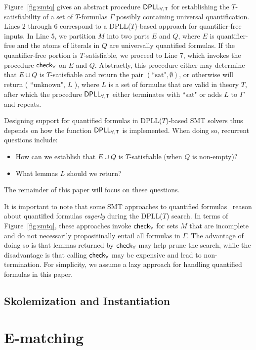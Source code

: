 \documentclass[oribibl]{llncs}
\begin{document}
Figure~\ref{fig:smtq} gives an abstract procedure $\small\mathsf{DPLL_{\forall, T}}$
for establishing the $T$-satisfiability of a set of $T$-formulas $\Gamma$ possibly containing universal quantification.
Lines 2 through 6 correspond to a DPLL($T$)-based approach for quantifier-free inputs.
In Line 5, we partition $M$ into two parts $E$ and $Q$,
where $E$ is quantifier-free and the atoms of literals in $Q$ are universally quantified formulas.
If the quantifier-free portion is $T$-satisfiable,
we proceed to Line 7, which invokes the procedure $\small\mathsf{check}_\forall$ on $E$ and $Q$.
Abstractly, this procedure either may determine that $E \cup Q$ is $T$-satisfiable and return the pair $( \text{``sat"}, \emptyset )$,
or otherwise will return ( ``unknown", $L$ ), where $L$ is a set of formulas that are valid in theory $T$,
after which the procedure $\small\mathsf{DPLL_{\forall, T}}$ either terminates with ``sat" or adds $L$ to $\Gamma$ and repeats.

Designing support for quantified formulas in DPLL($T$)-based SMT solvers 
thus depends on how the function $\small\mathsf{DPLL_{\forall, T}}$ is implemented.
When doing so, recurrent questions include:
\begin{itemize}
\item How can we establish that $E \cup Q$ is $T$-satisfiable (when $Q$ is non-empty)?
\item What lemmas $L$ should we return?
\end{itemize}
The remainder of this paper will focus on these questions.

It is important to note that some SMT approaches to quantified formulas~\cite{}
reason about quantified formulas \emph{eagerly} during the DPLL($T$) search.
In terms of Figure~\ref{fig:smtq}, these approaches invoke $\small\mathsf{check}_\forall$
for sets $M$ that are incomplete and do not necessarily propositinally entail all formulas in $\Gamma$.
The advantage of doing so is that lemmas returned by $\small\mathsf{check}_\forall$ may help prune the search,
while the disadvantage is that calling $\small\mathsf{check}_\forall$ may be expensive and lead to non-termination.
For simplicity, we assume a lazy approach for handling quantified formulas in this paper.

\subsection{Skolemization and Instantiation}


\section{E-matching}
\end{document}
